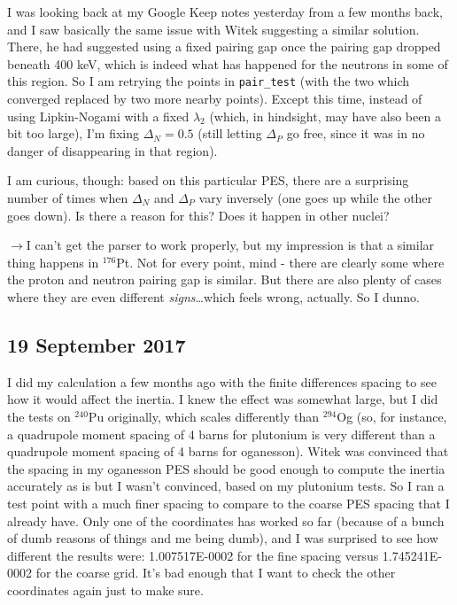 I was looking back at my Google Keep notes yesterday from a few months back, and I saw basically the same issue with Witek suggesting a similar solution. There, he had suggested using a fixed pairing gap once the pairing gap dropped beneath 400 keV, which is indeed what has happened for the neutrons in some of this region. So I am retrying the points in \texttt{pair\_test} (with the two which converged replaced by two more nearby points). Except this time, instead of using Lipkin-Nogami with a fixed $\lambda_2$ (which, in hindsight, may have also been a bit too large), I'm fixing $\Delta_N=0.5$ (still letting $\Delta_P$ go free, since it was in no danger of disappearing in that region).

I am curious, though: based on this particular PES, there are a surprising number of times when $\Delta_N$ and $\Delta_P$ vary inversely (one goes up while the other goes down). Is there a reason for this? Does it happen in other nuclei?

\begin{adjustwidth}{1cm}{}
$\rightarrow$\quad I can't get the parser to work properly, but my impression is that a similar thing happens in $^{176}$Pt. Not for every point, mind - there are clearly some where the proton and neutron pairing gap is similar. But there are also plenty of cases where they are even different \textit{signs}\dots which feels wrong, actually. So I dunno.
\end{adjustwidth}

\subsection*{19 September 2017}
I did my calculation a few months ago with the finite differences spacing to see how it would affect the inertia. I knew the effect was somewhat large, but I did the tests on $^{240}$Pu originally, which scales differently than $^{294}$Og (so, for instance, a quadrupole moment spacing of 4 barns for plutonium is very different than a quadrupole moment spacing of 4 barns for oganesson). Witek was convinced that the spacing in my oganesson PES should be good enough to compute the inertia accurately as is but I wasn't convinced, based on my plutonium tests. So I ran a test point with a much finer spacing to compare to the coarse PES spacing that I already have. Only one of the coordinates has worked so far (because of a bunch of dumb reasons of things and me being dumb), and I was surprised to see how different the results were: 1.007517E-0002 for the fine spacing versus 1.745241E-0002 for the coarse grid. It's bad enough that I want to check the other coordinates again just to make sure.


